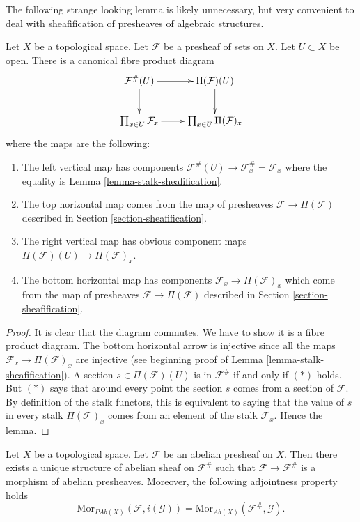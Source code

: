 \noindent
The following strange looking lemma is likely unnecessary, but
very convenient to deal with sheafification of presheaves
of algebraic structures.

\begin{lemma}
\label{lemma-diagram-fibre-product}
Let $X$ be a topological space. Let $\mathcal{F}$ be
a presheaf of sets on $X$. Let $U \subset X$ be open.
There is a canonical fibre product diagram
$$
\xymatrix{
\mathcal{F}^\#(U) \ar[d] \ar[r] &
\Pi(\mathcal{F})(U) \ar[d] \\
\prod_{x \in U} \mathcal{F}_x
\ar[r] &
\prod_{x \in U} \Pi(\mathcal{F})_x
}
$$
where the maps are the following:
\begin{enumerate}
\item The left vertical map has components
$\mathcal{F}^\#(U) \to \mathcal{F}^\#_x = \mathcal{F}_x$
where the equality is Lemma \ref{lemma-stalk-sheafification}.
\item The top horizontal map comes from the
map of presheaves $\mathcal{F} \to \Pi(\mathcal{F})$ described
in Section \ref{section-sheafification}.
\item The right vertical map has obvious component
maps $\Pi(\mathcal{F})(U) \to \Pi(\mathcal{F})_x$.
\item The bottom horizontal map has components
$\mathcal{F}_x \to \Pi(\mathcal{F})_x$
which come from the map of presheaves
$\mathcal{F} \to \Pi(\mathcal{F})$ described
in Section \ref{section-sheafification}.
\end{enumerate}
\end{lemma}

\begin{proof}
It is clear that the diagram commutes. We have to show
it is a fibre product diagram. The bottom horizontal arrow
is injective since all the maps $\mathcal{F}_x \to \Pi(\mathcal{F})_x$
are injective (see beginning proof of
Lemma \ref{lemma-stalk-sheafification}).
A section $s \in \Pi(\mathcal{F})(U)$ is in $\mathcal{F}^\#$ if and
only if $(*)$ holds. But $(*)$ says that around every point
the section $s$ comes from a section of $\mathcal{F}$. By definition
of the stalk functors, this is equivalent to saying that
the value of $s$ in every stalk $\Pi(\mathcal{F})_x$ comes
from an element of the stalk $\mathcal{F}_x$. Hence the lemma.
\end{proof}


\begin{lemma}
\label{lemma-sheafify-abelian-presheaf}
Let $X$ be a topological space.
Let $\mathcal{F}$ be an abelian presheaf on $X$.
Then there exists a unique structure of
abelian sheaf on $\mathcal{F}^\#$ such that
$\mathcal{F} \to \mathcal{F}^\#$ is a morphism
of abelian presheaves. Moreover, the following adjointness
property holds
$$
\text{Mor}_{\textit{PAb}(X)}(\mathcal{F}, i(\mathcal{G}))
=
\text{Mor}_{\textit{Ab}(X)}(\mathcal{F}^\#, \mathcal{G}).
$$
\end{lemma}

